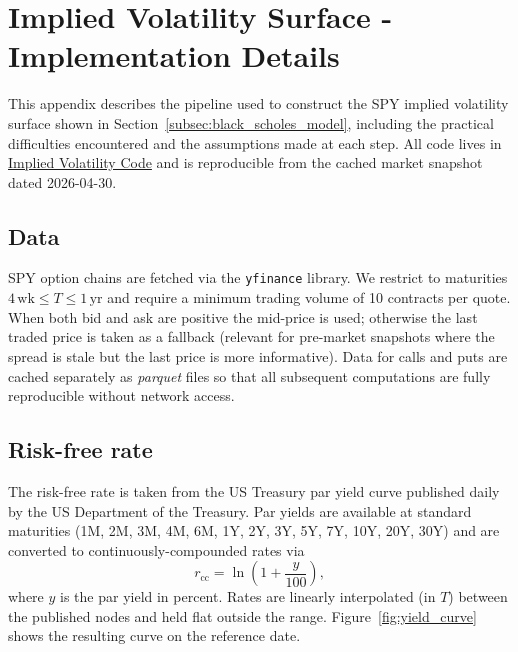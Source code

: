 
\chapter{Implied Volatility Surface - Implementation Details}
\label{app:impl_vol}

This appendix describes the pipeline used to construct the SPY implied volatility
surface shown in Section~\ref{subsec:black_scholes_model},
including the practical difficulties encountered and the assumptions made at each step.
All code lives in \href{https://github.com/M315/TFM/tree/main/scripts/impl_vol/}{Implied Volatility Code} and is reproducible from the cached
market snapshot dated 2026-04-30.

\section{Data}

SPY option chains are fetched via the \texttt{yfinance} library.
We restrict to maturities $4\,\text{wk} \leq T \leq 1\,\text{yr}$ and require a minimum
trading volume of 10 contracts per quote.
When both bid and ask are positive the mid-price is used;
otherwise the last traded price is taken as a fallback (relevant for pre-market snapshots
where the spread is stale but the last price is more informative).
Data for calls and puts are cached separately as \textit{parquet} files so that all
subsequent computations are fully reproducible without network access.

\section{Risk-free rate}

The risk-free rate is taken from the US Treasury par yield curve published daily
by the US Department of the Treasury.
Par yields are available at standard maturities (1M, 2M, 3M, 4M, 6M, 1Y, 2Y, 3Y,
5Y, 7Y, 10Y, 20Y, 30Y) and are converted to continuously-compounded rates via
\begin{equation*}
    r_{\mathrm{cc}} = \ln\!\left(1 + \frac{y}{100}\right),
\end{equation*}
where $y$ is the par yield in percent.
Rates are linearly interpolated (in $T$) between the published nodes and held flat
outside the range.
Figure~\ref{fig:yield_curve} shows the resulting curve on the reference date.

